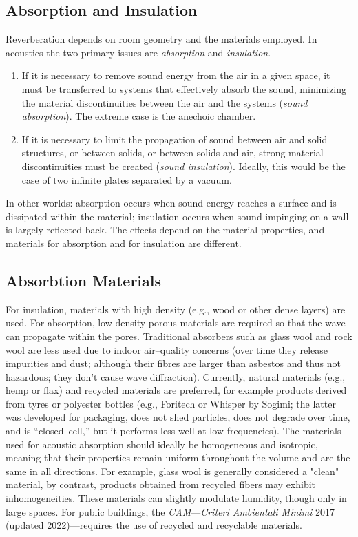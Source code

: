 \subsection{Absorption and Insulation}

Reverberation depends on room geometry and the materials employed. In acoustics the two primary issues are \emph{absorption} and \emph{insulation}. 

\begin{enumerate}
  \item If it is necessary to remove sound energy from the air in a given space, it must be transferred to systems that effectively absorb the sound, minimizing the material discontinuities between the air and the systems (\emph{sound absorption}). The extreme case is the anechoic chamber.
  \item If it is necessary to limit the propagation of sound between air and solid structures, or between solids, or between solids and air, strong material discontinuities must be created (\emph{sound insulation}). Ideally, this would be the case of two infinite plates separated by a vacuum.
\end{enumerate}

In other worlds: absorption occurs when sound energy reaches a surface and is dissipated within the material; insulation occurs when sound impinging on a wall is largely reflected back. The effects depend on the material properties, and materials for absorption and for insulation are different.

\subsection{Absorbtion Materials}

For insulation, materials with high density (e.g., wood or other dense layers) are used. For absorption, low density porous materials are required so that the wave can propagate within the pores. Traditional absorbers such as glass wool and rock wool are less used due to indoor air–quality concerns (over time they release impurities and dust; although their fibres are larger than asbestos and thus not hazardous; they don't cause wave diffraction). Currently, natural materials (e.g., hemp or flax) and recycled materials are preferred, for example products derived from tyres or polyester bottles (e.g., Foritech or Whisper by Sogimi; the latter was developed for packaging, does not shed particles, does not degrade over time, and is ``closed–cell,'' but it performs less well at low frequencies). The materials used for acoustic absorption should ideally be homogeneous and isotropic, meaning that their properties remain uniform throughout the volume and are the same in all directions. For example, glass wool is generally considered a "clean" material, by contrast, products obtained from recycled fibers may exhibit inhomogeneities. These materials can slightly modulate humidity, though only in large spaces. For public buildings, the \emph{CAM}—\emph{Criteri Ambientali Minimi} 2017 (updated 2022)—requires the use of recycled and recyclable materials.

